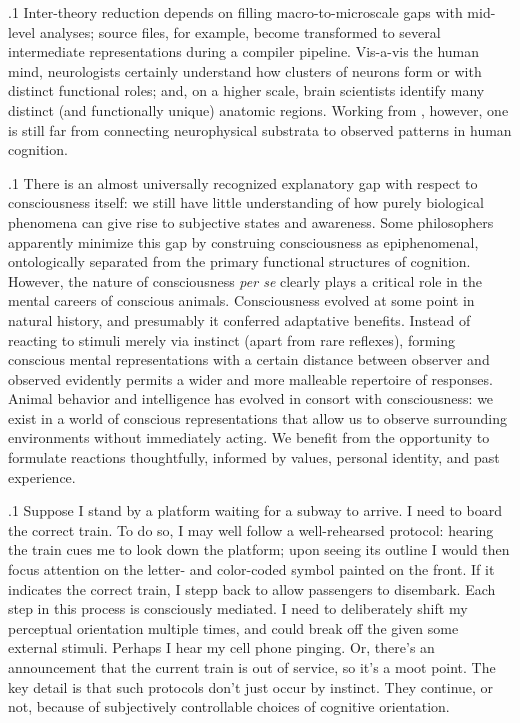 \documentclass[11pt, twocolumn]{article}
\begin{document}
\p.1{%
Inter-theory reduction depends on filling macro-to-microscale gaps with mid-level
analyses; source files, for example, become transformed to several
intermediate representations during a compiler pipeline.  Vis-a-vis the
human mind, neurologists certainly understand how clusters of neurons
form  or  with distinct functional roles; and,
on a higher scale, brain scientists identify many distinct
(and functionally unique) anatomic regions.  Working from
, however, one is still far from connecting
neurophysical substrata to observed patterns in human cognition.
} %

\p.1{%
There is an almost universally recognized explanatory gap with respect
to consciousness itself: we still have little understanding of
how purely biological phenomena can give rise to subjective
 states and awareness.  Some philosophers
apparently minimize this gap by construing consciousness as epiphenomenal,
ontologically separated from the primary functional structures
of cognition.  However, the nature of consciousness \textit{per se} clearly
plays a critical role in the mental careers of conscious animals.
Consciousness evolved at some point in natural history, and presumably
it conferred adaptative benefits.  Instead of reacting to stimuli
merely via instinct (apart from rare
 reflexes), forming conscious mental representations
\mdash{} with a certain distance between observer and
observed \mdash{}
evidently permits a wider and more malleable repertoire
of responses.  Animal behavior and intelligence
has evolved in consort with consciousness: we exist in a world
of conscious representations that allow us to observe
surrounding environments without immediately acting.  We benefit
from the opportunity to formulate reactions thoughtfully, informed
by values, personal identity, and past experience.
} %

\p.1{%
Suppose I stand by a platform waiting for a subway to arrive.  I need to board
the correct train.  To do so, I may well follow a well-rehearsed
protocol: hearing the train cues me to look down the platform; upon seeing
its outline I would then focus attention on the letter- and color-coded
symbol painted on the front.  If it indicates the correct train,
I stepp back to allow passengers
to disembark.  Each step in this process is consciously mediated.
I need to deliberately shift my perceptual orientation multiple
times, and could break off the  given some external
stimuli.  Perhaps I hear my cell phone pinging.  Or, there's an announcement
that the current train is out of service, so it's a moot point.  The key
detail is that such protocols don't just occur by instinct.  They continue,
or not, because of subjectively controllable choices of cognitive orientation.
} %
\end{document}
